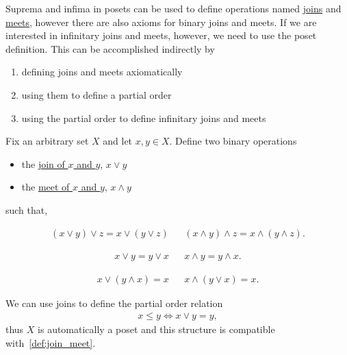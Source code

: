 Suprema and infima in posets can be used to define operations named \uline{joins} and \uline{meets}, however there are also axioms for binary joins and meets. If we are interested in infinitary joins and meets, however, we need to use the poset definition. This can be accomplished indirectly by
\begin{enumerate}
  \item defining joins and meets axiomatically
  \item using them to define a partial order
  \item using the partial order to define infinitary joins and meets
\end{enumerate}

\begin{definition}\label{def:binary_join_meet}
  Fix an arbitrary set $X$ and let $x, y \in X$. Define two binary operations
  \begin{itemize}
    \item the \uline{join of $x$ and $y$}, $x \lor y$
    \item the \uline{meet of $x$ and $y$}, $x \land y$
  \end{itemize}
  such that,
  \begin{description}
    \begin{align*}
      (x \lor y) \lor z = x \lor (y \lor z)
      &&
      (x \land y) \land z = x \land (y \land z).
    \end{align*}

    \begin{align*}
      x \lor y = y \lor x
      &&
      x \land y = y \land x.
    \end{align*}

    \begin{align*}
      x \lor (y \land x) = x
      &&
      x \land (y \lor x) = x.
    \end{align*}
  \end{description}

  We can use joins to define the partial order relation
  \begin{align*}
    x \leq y \iff x \lor y = y,
  \end{align*}
  thus $X$ is automatically a poset and this structure is compatible with~\cref{def:join_meet}.
\end{definition}
